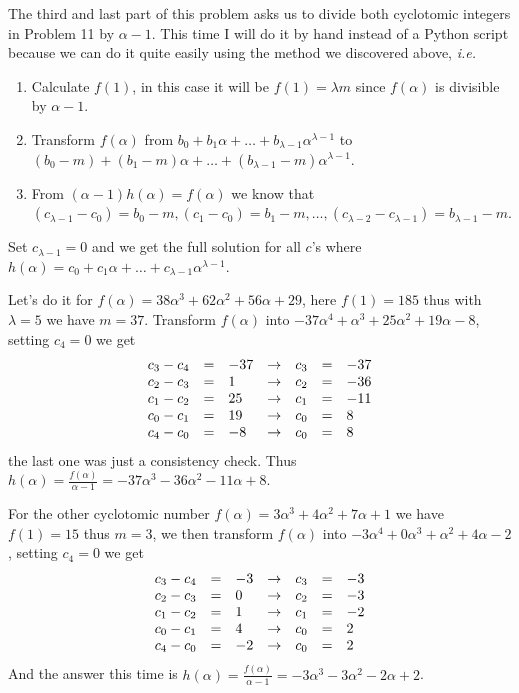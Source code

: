 \documentclass[aps,preprint,preprintnumbers,nofootinbib,showpacs,prd]{revtex4-1}
\newcommand{\ie}{{\it i.e.} }
\newcommand{\nbea}{\begin{eqnarray*}}
\newcommand{\neea}{\end{eqnarray*}}
\begin{document}
The third and last part of this problem asks us to divide both cyclotomic integers in Problem 11 by $\alpha - 1$. This time I will do it by hand instead of a Python script because we can do it quite easily using the method we discovered above, \ie 
%
\begin{enumerate}
%
\item Calculate $f(1)$, in this case it will be $f(1) = \lambda m$ since $f(\alpha)$ is divisible by $\alpha - 1$.
%
\item Transform $f(\alpha)$ from $b_0 + b_1\alpha + \dots + b_{\lambda - 1}\alpha^{\lambda - 1}$ to $(b_0 - m) + (b_1 - m)\alpha + \dots + (b_{\lambda - 1} - m)\alpha^{\lambda - 1}$.
%
\item From $(\alpha - 1)h(\alpha) = f(\alpha)$ we know that $(c_{\lambda - 1} - c_0) = b_0 - m, (c_1 - c_0) = b_1 - m, \dots, (c_{\lambda-2} - c_{\lambda - 1}) = b_{\lambda - 1} - m$.
\end{enumerate}
%
Set $c_{\lambda - 1} = 0$ and we get the full solution for all $c$'s where $h(\alpha) = c_0 + c_1\alpha + \dots + c_{\lambda - 1}\alpha^{\lambda - 1}$.

Let's do it for $f(\alpha) = 38\alpha^3 + 62\alpha^2 + 56\alpha + 29$, here $f(1) = 185$ thus with $\lambda = 5$ we have $m = 37$. Transform $f(\alpha)$ into $-37\alpha^4 + \alpha^3 + 25\alpha^2 + 19 \alpha - 8$, setting $c_4 = 0$ we get
%
\nbea
\begin{array}{r c l c r c l}
c_3 - c_4 & = & -37 & \to & c_3 & = & -37 \\
c_2 - c_3 & = & 1 & \to & c_2 & = & -36 \\
c_1 - c_2 & = & 25 & \to & c_1 & = & -11 \\
c_0 - c_1 & = & 19 & \to & c_0 & = & 8 \\
c_4 - c_0 & = & -8 & \to & c_0 & = & 8
\end{array}
\neea
%
the last one was just a consistency check. Thus $h(\alpha) = \frac{f(\alpha)}{\alpha - 1} = -37\alpha^3 -36\alpha^2 -11\alpha + 8$.

For the other cyclotomic number $f(\alpha) = 3\alpha^3 + 4\alpha^2 + 7\alpha + 1$ we have $f(1) = 15$ thus $m = 3$, we then transform $f(\alpha)$ into $-3\alpha^4 + 0\alpha^3 + \alpha^2 + 4\alpha - 2$, setting $c_4 = 0$ we get
%
\nbea
\begin{array}{r c l c r c l}
c_3 - c_4 & = & -3 & \to & c_3 & = & -3 \\
c_2 - c_3 & = & 0 & \to & c_2 & = & -3 \\
c_1 - c_2 & = & 1 & \to & c_1 & = & -2 \\
c_0 - c_1 & = & 4 & \to & c_0 & = & 2 \\
c_4 - c_0 & = & -2 & \to & c_0 & = & 2
\end{array}
\neea
%
And the answer this time is $h(\alpha) = \frac{f(\alpha)}{\alpha - 1} = -3\alpha^3 - 3\alpha^2 - 2\alpha + 2$.
\end{document}
